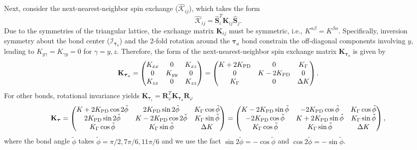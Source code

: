 \documentclass[aps, prx, nofootinbib, preprintnumbers, superscriptaddress]{revtex4-2}
\begin{document}
Next, consider the next-nearest-neighbor spin exchange ($\hat{\mathcal{K}}_{ij}$), which takes the form
\begin{equation}
    \hat{\mathcal{K}}_{ij} 
    = \hat{\mathbf{S}}_{i}^{T} \mathbf{K}_{ij} \hat{\mathbf{S}}_{j}.
\end{equation}
Due to the symmetries of the triangular lattice, the exchange matrix $\mathbf{K}_{ij}$ must be symmetric, i.e., $K^{\alpha\beta} = K^{\beta\alpha}$. Specifically, inversion symmetry about the bond center ($\mathcal{I}_{\boldsymbol{\tau}_{a}}$) and the 2-fold rotation around the $\boldsymbol{\tau}_a$ bond constrain the off-diagonal components involving $y$, leading to $K_{y\gamma} = K_{\gamma y} = 0$ for $\gamma = y, z$. Therefore, the form of the next-nearest-neighbor spin exchange matrix $\mathbf{K}_{\boldsymbol{\tau}_{a}}$ is given by
\begin{equation}
    \mathbf{K}_{\boldsymbol{\tau}_{a}}
    =
    \begin{pmatrix}
        K_{xx} & 0 & K_{xz} \\
        0 & K_{yy} & 0 \\
        K_{zx} & 0 & K_{zz}
    \end{pmatrix}
    =
    \begin{pmatrix}
        K + 2 K_{\rm PD} & 0                & K_{\Gamma} \\
        0                & K - 2 K_{\rm PD} & 0 \\
        K_{\Gamma}       & 0                & \Delta K
    \end{pmatrix}.
\end{equation}
For other bonds, rotational invariance yields $\mathbf{K}_{\boldsymbol{\tau}_{i}} = \mathbf{R}_{\varphi}^{T} \mathbf{K}_{\boldsymbol{\tau}_{a}} \mathbf{R}_{\varphi}$
\begin{equation}
    \mathbf{K}_{\boldsymbol{\tau}} 
    =
    \begin{pmatrix}
        K + 2 K_{\rm PD} \cos 2\tilde{\phi} &     2 K_{\rm PD} \sin 2\tilde{\phi} & K_{\Gamma} \cos \tilde{\phi} \\
            2 K_{\rm PD} \sin 2\tilde{\phi} & K - 2 K_{\rm PD} \cos 2\tilde{\phi} & K_{\Gamma} \sin \tilde{\phi} \\
              K_{\Gamma} \cos  \tilde{\phi} &       K_{\Gamma}  \sin \tilde{\phi} & \Delta K
    \end{pmatrix}
    =
    \begin{pmatrix}
        K - 2 K_{\rm PD} \sin \tilde{\phi} &   - 2 K_{\rm PD} \cos \tilde{\phi} & K_{\Gamma} \cos \tilde{\phi} \\
          - 2 K_{\rm PD} \cos \tilde{\phi} & K + 2 K_{\rm PD} \sin \tilde{\phi} & K_{\Gamma} \sin \tilde{\phi} \\
              K_{\Gamma} \cos \tilde{\phi} &       K_{\Gamma} \sin \tilde{\phi} & \Delta K
    \end{pmatrix},
\end{equation}
where the bond angle $\tilde{\phi}$ takes $\tilde{\phi} = \pi/2, 7\pi/6, 11\pi/6$ and we use the fact $\sin 2\tilde{\phi} = - \cos \tilde{\phi}$ and $\cos 2\tilde{\phi} = - \sin \tilde{\phi}$.
\end{document}
